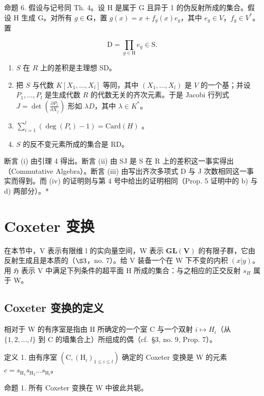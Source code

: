 命题 6. 假设与记号同 Th. 4。设 H 是属于 G 且异于 1 的伪反射所成的集合。假设 H 生成 G。对所有 \(g \in \mathbf{G}\)，置 \(g(x) = x + f_g(x)e_g\)，其中 \(e_g \in V\)，\(f_g \in V^*\)。置

\[
\mathrm{D} = \prod_ {g \in \mathrm{H}} e _ {g} \in \mathrm{S}.
\]

\begin{enumerate}
\def\labelenumi{(\roman{enumi})}
\item
  \(S\) 在 \(R\) 上的差积是主理想 SD。
\item
  把 \(S\) 与代数 \(K[X_1, \ldots, X_l]\) 等同，其中 \((X_1, \ldots, X_l)\) 是 \(V\) 的一个基；并设 \(P_1, \ldots, P_l\) 是生成代数 \(R\) 的代数无关的齐次元素。于是 Jacobi 行列式 \(J = \det\left(\frac{\partial P_i}{\partial X_j}\right)\) 形如 \(\lambda D\)，其中 \(\lambda \in K^*\)。
\item
  \(\sum_{i=1}^{l} (\deg(P_i) - 1) = \text{Card}(H)\) 。
\item
  \(S\) 的反不变元素所成的集合是 RD。
\end{enumerate}

断言 (i) 由引理 4 得出。断言 (ii) 由 SJ 是 S 在 R 上的差积这一事实得出（Commutative Algebra）。断言 (iii) 由写出齐次多项式 D 与 J 次数相同这一事实而得到。而 (iv) 的证明则与第 4 号中给出的证明相同（Prop. 5 证明中的 b) 与 d) 两部分）。*

\section{Coxeter 变换}

在本节中，V 表示有限维 l 的实向量空间，W 表示 \(\mathbf{GL}(\mathbf{V})\) 的有限子群，它由反射生成且是本质的（\(\S3\)，no. 7）。给 V 装备一个在 W 下不变的内积 \((x|y)\)。用 \(\mathfrak{H}\) 表示 V 中满足下列条件的超平面 H 所成的集合：与之相应的正交反射 \(s_{H}\) 属于 W。

\subsection{Coxeter 变换的定义}

相对于 W 的有序室是指由 H 所确定的一个室 C 与一个双射 \(i \mapsto H_{i}\)（从 \(\{1, 2, \ldots, l\}\) 到 C 的墙集合上）所组成的偶（cf.~§3, no. 9, Prop. 7）。

定义 1. 由有序室 \((\mathrm{C},(\mathrm{H}_i)_{1\leqslant i\leqslant l})\) 确定的 Coxeter 变换是 W 的元素 \(c = s_{\mathrm{H}_1}s_{\mathrm{H}_2}\dots s_{\mathrm{H}_l}\)。

命题 1. 所有 Coxeter 变换在 W 中彼此共轭。

